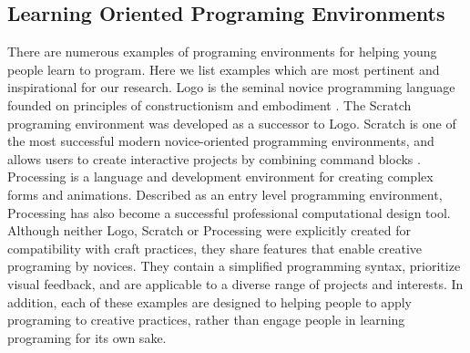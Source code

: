 \documentclass{sigchi}
\begin{document}
\subsection{Learning Oriented Programing Environments}
There are numerous examples of programing environments for helping young people learn to program. Here we list examples which are most pertinent and inspirational for our research. Logo is the seminal novice programming language founded on principles of constructionism and embodiment \cite{papert}. The Scratch programing environment was developed as a successor to Logo. Scratch is one of the most successful modern novice-oriented programming environments, and allows users to create interactive projects by combining command blocks \cite{resnick2}. Processing is a language and development environment for creating complex forms and animations. Described as an entry level programming environment, Processing has also become a successful professional computational design tool\cite{processing}. Although neither Logo, Scratch or Processing were explicitly created for compatibility with craft practices, they share features that enable creative programing by novices. They contain a simplified programming syntax, prioritize visual feedback, and are applicable to a diverse range of projects and interests. In addition, each of these examples are designed to helping people to apply programing to creative practices, rather than engage people in learning programing for its own sake. 
\end{document}
